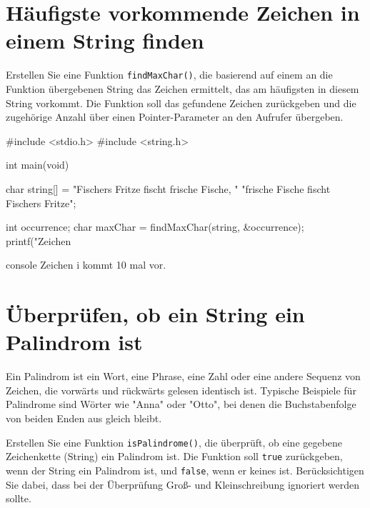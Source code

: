 \chapter{Häufigste vorkommende Zeichen in einem String finden}
\vspace{10pt}

Erstellen Sie eine Funktion \texttt{findMaxChar()}, die basierend auf
einem an die Funktion übergebenen String das Zeichen ermittelt, das am
häufigsten in diesem String vorkommt. Die Funktion soll das gefundene Zeichen
zurückgeben und die zugehörige Anzahl über einen Pointer-Parameter an den
Aufrufer übergeben.

\Vorlage
\begin{codebox}[lang=c, fontsize=\small]
#include <stdio.h>
#include <string.h>

int main(void) {
    char string[] = "Fischers Fritze fischt frische Fische, "
                    "frische Fische fischt Fischers Fritze";

    int occurrence;
    char maxChar = findMaxChar(string, &occurrence);
    printf("Zeichen %
}
\end{codebox}

\begin{mybox}[Bildschirmausgabe]{console}
Zeichen i kommt 10 mal vor.
\end{mybox}




\chapter{Überprüfen, ob ein String ein Palindrom ist}

\vspace{10pt}

Ein Palindrom ist ein Wort, eine Phrase, eine Zahl oder eine andere Sequenz von
Zeichen, die vorwärts und rückwärts gelesen identisch ist. Typische Beispiele
für Palindrome sind Wörter wie "Anna" oder "Otto", bei denen die Buchstabenfolge
von beiden Enden aus gleich bleibt.

Erstellen Sie eine Funktion \texttt{isPalindrome()}, die überprüft, ob
eine gegebene Zeichenkette (String) ein Palindrom ist. Die Funktion soll
\texttt{true} zurückgeben, wenn der String ein Palindrom ist, und
\texttt{false}, wenn er keines ist. Berücksichtigen Sie dabei, dass bei
der Überprüfung Groß- und Kleinschreibung ignoriert werden sollte.

